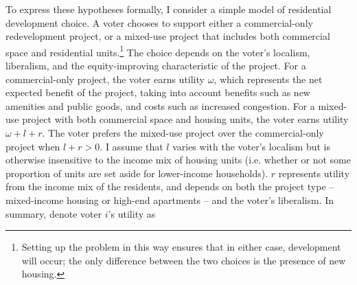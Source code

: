 \documentclass[article,11pt]{memoir}
\begin{document}

To express these hypotheses formally, I consider a simple model of residential development choice.  A voter chooses to support either a commercial-only redevelopment project, or a mixed-use project that includes both commercial space and residential units.\footnote{Setting up the problem in this way ensures that in either case, development will occur; the only difference between the two choices is the presence of new housing.}  The choice depends on the voter's localism, liberalism, and the equity-improving characteristic of the project.  For a commercial-only project, the voter earns utility $\omega$, which represents the net expected benefit of the project, taking into account benefits such as new amenities and public goods, and costs such as increased congestion.  For a mixed-use project with both commercial space and housing units, the voter earns utility $\omega + l + r$.  The voter prefers the mixed-use project over the commercial-only project when $l + r > 0$.  I assume that $l$ varies with the voter's localism but is otherwise insensitive to the income mix of housing units (i.e. whether or not some proportion of units are set aside for lower-income households). $r$ represents utility from the income mix of the residents, and depends on both the project type -- mixed-income housing or high-end apartments -- and the voter's liberalism.  In summary, denote voter $i$'s utility as
\end{document}
